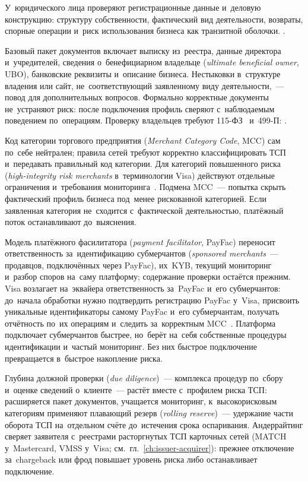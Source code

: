 У~юридического лица проверяют регистрационные данные и~деловую конструкцию:
структуру собственности, фактический вид деятельности, возвраты, спорные
операции и~риск использования бизнеса как транзитной оболочки.
.

Базовый пакет документов включает выписку из~реестра, данные директора
и~учредителей, сведения о~бенефициарном владельце (\textit{ultimate beneficial
owner}, UBO), банковские реквизиты и~описание бизнеса. Нестыковки в~структуре
владения или сайт, не~соответствующий заявленному виду деятельности,~--- повод
для дополнительных вопросов. Формально корректные документы не~устраняют риск:
после подключения профиль сверяют с~наблюдаемым поведением по~операциям.
Проверку владельцев требуют 115-ФЗ~\cite{fz-115}
и~499-П: .

Код категории торгового предприятия (\textit{Merchant Category Code}, MCC) сам
по~себе нейтрален; правила сетей требуют корректно классифицировать ТСП
и~передавать правильный код категории. Для категорий повышенного риска
(\textit{high-integrity risk merchants} в~терминологии Visa) действуют
отдельные ограничения и~требования мониторинга~\cite{visa-core-rules}. Подмена
MCC~--- попытка скрыть фактический профиль бизнеса под~менее рискованной
категорией. Если заявленная категория не~сходится с~фактической деятельностью,
платёжный поток останавливают до~выяснения.

Модель платёжного фасилитатора (\textit{payment facilitator}, PayFac) переносит
ответственность за~идентификацию субмерчантов (\textit{sponsored merchants}~---
продавцов, подключённых через PayFac), их~KYB, текущий мониторинг и~разбор
споров на~саму платформу; содержание проверки остаётся прежним. Visa возлагает
на~эквайера ответственность за~PayFac и~его субмерчантов: до~начала обработки
нужно подтвердить регистрацию PayFac у~Visa, присвоить уникальные
идентификаторы самому PayFac и~его субмерчантам, получать отчётность по~их
операциям и~следить за~корректным MCC~\cite{visa-core-rules}. Платформа
подключает субмерчантов быстрее, но~берёт на~себя собственные процедуры
идентификации и~частый мониторинг. Без них быстрое подключение превращается
в~быстрое накопление риска.

Глубина должной проверки (\textit{due diligence})~--- комплекса процедур
по~сбору и~оценке сведений о~клиенте~--- растёт вместе с~профилем риска ТСП:
расширяется пакет документов, учащается мониторинг, к~высокорисковым категориям
применяют плавающий резерв (\textit{rolling reserve})~--- удержание части
оборота ТСП на~отдельном счёте до~истечения срока оспаривания. Андеррайтинг
сверяет заявителя с~реестрами расторгнутых ТСП карточных сетей (MATCH
у~Mastercard, VMSS у~Visa; см.~гл.~\ref{ch:issuer-acquirer}): прежнее
отключение за~chargeback или фрод повышает уровень риска либо останавливает
подключение.

